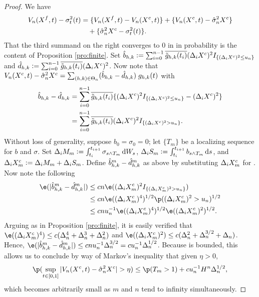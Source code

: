 \begin{proof} 
We have
\begin{align}
V_n(X^f,t)  - \sigma_t^2(t) & = \{V_n(X^f,t)  - V_n(X^c, t)\}  + \{V_n(X^c,t)  - \hat{\sigma}_{n}^2{X^c}\} \notag \\
& \quad +  \{ \hat{\sigma}_{n}^2{X^c} - \sigma_t^2(t)\}. \label{eq:now}
\end{align}
That the third summand on the right converges to 0 in \Ltwo in  probability is the content of Proposition \ref{pro:finite}. 
Set
    $\hat{b}_{h,k} := \sum_{i =0}^{n-1} \overline{\tilde{g}_{h,k}(t_i)} (\Delta_i X^c)^2I_{\{(\Delta_i X^c)^2 \le  u_n\}}$ and  
  $\hat{d}_{h,k} := \sum_{i =0}^{n-1} \overline{\tilde{g}_{h,k}(t_i)} (\Delta_i X^c)^2$.
Now note that
$V_n(X^c,t)  - \hat{\sigma}_{n}^2{X^c} = \sum_{(h,k) \in \Theta_n} (\hat{b}_{h,k}  - \hat{d}_{h,k})\;g_{h,k}(t)$ 
with 
\begin{align}
  \hat{b}_{h,k}  - \hat{d}_{h,k} &= \sum_{i =0}^{n-1} \overline{\tilde{g}_{h,k}(t_i)}\{ (\Delta_i X^c)^2 I_{\{(\Delta_i X^c)^2 \le u_n\}}- (\Delta_i X^c)^2\}\notag\\
  &= \sum_{i =0}^{n-1} \overline{\tilde{g}_{h,k}(t_i)} (\Delta_i X^c)^2 I_{\{(\Delta_i X^c)^2 > u_n\}} \notag.
  \label{}
\end{align} 
Without loss of generality, suppose $b_0 = \sigma_0 = 0$; let $\{T_m\}$ be a localizing sequence for $b$ and $\sigma$.   
Set $\Delta_i M_m := \int_{t_i}^{t_{i+1}} \sigma_{s\wedge T_m} \D W_s$, $\Delta_i S_m := \int_{t_i}^{t_{i+1}} b_{s\wedge T_m} \D s$, and $\Delta_i X^c_m :=  \Delta_i M_m + \Delta_i S_m$. Define $\hat{b}^m_{h,k}  - \hat{d}_{h,k}^m$ as above by substituting $\Delta_i X^c_m$ for \dxc. Now note the following
\begin{align}
  \e(\vert \hat{b}^m_{h,k}  - \dnhk^m \vert ) &\le c n \e( (\dxc_m)^2 I_{\{( \dxc_m)^2 > u_n\}})\notag\\
  & \le c n \e( (\dxc_m)^4)^{1/2}  \p(( \dxc_m)^2 > u_n)^{1/2}\notag\\
  & \le c n u_n^{-1} \e( (\dxc_m)^4)^{1/2}  \e(( \dxc_m)^2)^{1/2}\notag.
  \label{}
\end{align}
Arguing as in Proposition \ref{pro:finite}, it is easily verified that $\e( (\dxc_m)^4) \le  c (\Delta_n^4 + \Delta_n^3 + \Delta_n^2)$ and $ \e( (\dxc_m)^2)  \le  c(\Delta_n^2 + \Delta_n^{3/2} + \Delta_n)$. Hence, $\e(\vert \hat{b}^m_{h,k}  - \dnhk^m \vert ) \le c n u_n^{-1}\Delta^{3/2}_n = c u_n^{-1}\Delta^{1/2}_n $. Because \tghk is bounded, this allows us to conclude by way of Markov's inequality that given $\eta > 0$, 
\begin{align}
  \p(\sup_{t \in \domain} \vert V_n(X^c,t)  - \svn{X^c} \vert > \eta) \le \p(T_m > 1) + c u^{-1}_n H^n \Delta_n^{1/2},\notag
  \label{}
\end{align}
which becomes arbitrarily small as $m$ and $n$ tend to infinity simultaneously.


\end{proof}
